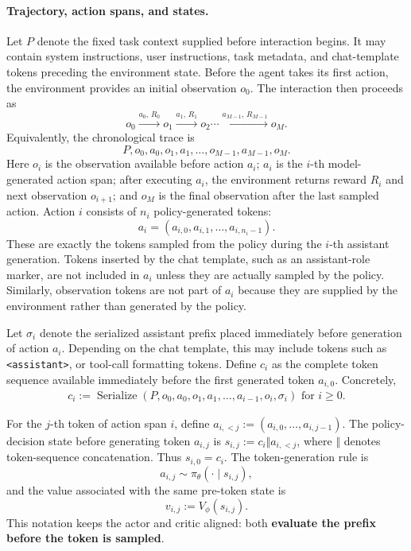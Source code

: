 \paragraph{Trajectory, action spans, and states.}
Let $P$ denote the fixed task context supplied before interaction begins. It may contain system instructions, user instructions, task metadata, and chat-template tokens preceding the environment state. Before the agent takes its first action, the environment provides an initial observation $o_0$. The interaction then proceeds as
\[
    o_0 \xrightarrow{a_0,\,R_0} o_1
    \xrightarrow{a_1,\,R_1} o_2
    \cdots
    \xrightarrow{a_{M-1},\,R_{M-1}} o_M.
\]
Equivalently, the chronological trace is
\[
    P,o_0,a_0,o_1,a_1,\ldots,o_{M-1},a_{M-1},o_M.
\]
Here $o_i$ is the observation available before action $a_i$; $a_i$ is the $i$-th model-generated action span; after executing $a_i$, the environment returns reward $R_i$ and next observation $o_{i+1}$; and $o_M$ is the final observation after the last sampled action. 
Action $i$ consists of $n_i$ policy-generated tokens:
\[
    a_i=(a_{i,0},a_{i,1},\ldots,a_{i,n_i-1}).
\]
These are exactly the tokens sampled from the policy during the $i$-th assistant generation. Tokens inserted by the chat template, such as an assistant-role marker, are not included in $a_i$ unless they are actually sampled by the policy. Similarly, observation tokens are not part of $a_i$ because they are supplied by the environment rather than generated by the policy.

Let $\sigma_i$ denote the serialized assistant prefix placed immediately before generation of action $a_i$. Depending on the chat template, this may include tokens such as \texttt{<assistant>}, or tool-call formatting tokens. Define $c_i$ as the complete token sequence available immediately before the first generated token $a_{i,0}$. Concretely,
\begin{align*}
    c_i
    :=
    \operatorname{Serialize}(P,o_0,a_0,o_1,a_1,\ldots,a_{i-1},o_i,\sigma_i) \text{ for } i\ge 0.
\end{align*}
    



For the $j$-th token of action span $i$, define $a_{i,<j}:=(a_{i,0},\ldots,a_{i,j-1})$.
The policy-decision state before generating token $a_{i,j}$ is $s_{i,j}:=c_i\Vert a_{i,<j}$, where $\Vert$ denotes token-sequence concatenation. Thus $s_{i,0}=c_i$. The token-generation rule is
\[
    a_{i,j}\sim \pi_\theta(\cdot\mid s_{i,j}),
\]
and the value associated with the same pre-token state is
\[
    v_{i,j}:=V_\phi(s_{i,j}).
\]
This notation keeps the actor and critic aligned: both \textbf{evaluate the prefix before the token is sampled}.

